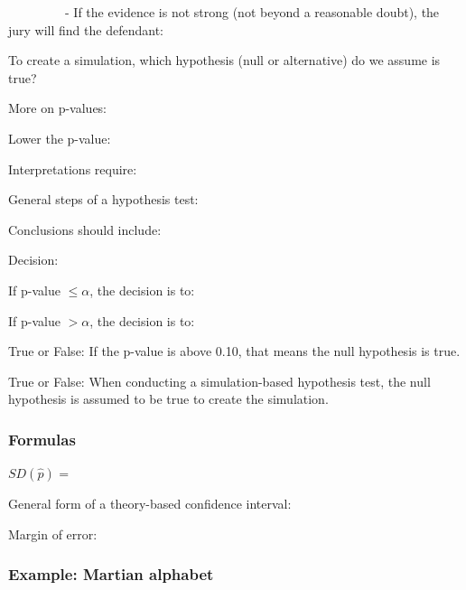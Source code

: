 \documentclass[
]{report}
\newcommand{\rgs}{\vspace{12pt}} %
\newcommand{\rgi}{\hspace{24pt}}  %
\begin{document}
~~~~~~~~~- If the evidence is not strong (not beyond a reasonable doubt), the jury will find the defendant:

\rgs

To create a simulation, which hypothesis (null or alternative) do we assume is true?
\rgs

More on p-values:

\rgi Lower the p-value:
\rgs

\rgi Interpretations require:
\rgs

General steps of a hypothesis test:
\rgs

Conclusions should include:
\rgs

Decision:

\rgi If p-value \(\leq \alpha\), the decision is to:

\rgi If p-value \(> \alpha\), the decision is to:

True or False: If the p-value is above 0.10, that means the null hypothesis is true.

True or False: When conducting a simulation-based hypothesis test, the null hypothesis is assumed to be true to create the simulation.

\hypertarget{formulas}{%
\subsubsection*{Formulas}\label{formulas}}

\(SD(\hat{p})\) =
\rgs

General form of a theory-based confidence interval:
\rgs

Margin of error:
\rgs

\hypertarget{example-martian-alphabet}{%
\subsubsection*{Example: Martian alphabet}\label{example-martian-alphabet}}
\end{document}
